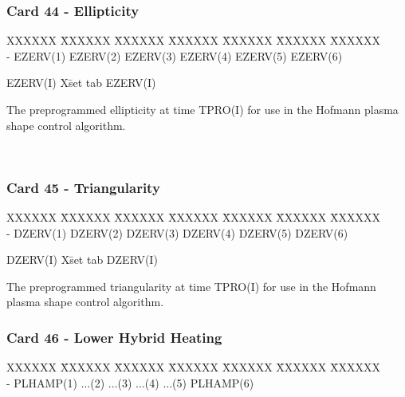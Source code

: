 \subsubsection{Card 44 - Ellipticity}
\begin{tabbing}
XXXXXX \= XXXXXX \= XXXXXX \= XXXXXX \= XXXXXX \= XXXXXX \=
XXXXXX       \\
\footnotesize - \>\footnotesize  EZERV(1) \>\footnotesize EZERV(2) \>\footnotesize EZERV(3)
\>\footnotesize EZERV(4) \>\footnotesize EZERV(5) \>\footnotesize EZERV(6) \\
\end{tabbing}
\begin{tabbing}
EZERV(I) X\= set tab \kill
EZERV(I) \> \parbox[t]{\width}{The preprogrammed ellipticity at time TPRO(I)
for use in the Hofmann plasma shape control algorithm.}\\
\end{tabbing}
\newpage \subsubsection{Card 45 - Triangularity}
\begin{tabbing}
XXXXXX \= XXXXXX \= XXXXXX \= XXXXXX \= XXXXXX \= XXXXXX \=
XXXXXX       \\
\footnotesize - \>\footnotesize  DZERV(1) \>\footnotesize DZERV(2) \>\footnotesize DZERV(3)
\>\footnotesize DZERV(4) \>\footnotesize DZERV(5) \>\footnotesize DZERV(6) \\
\end{tabbing}
\begin{tabbing}
DZERV(I) X\= set tab \kill
DZERV(I) \> \parbox[t]{\width}{The preprogrammed triangularity at time TPRO(I)
for use in the Hofmann plasma shape control algorithm.}
\end{tabbing}
\newpage \subsubsection{Card 46 - Lower Hybrid Heating}
\begin{tabbing}
XXXXXX \= XXXXXX \= XXXXXX \= XXXXXX \= XXXXXX \= XXXXXX \=
XXXXXX       \\
\footnotesize - \>\footnotesize  PLHAMP(1) \>\footnotesize $\ldots$(2) \>\footnotesize $\ldots$(3)
\>\footnotesize $\ldots$(4) \>\footnotesize $\ldots$(5) \>\footnotesize PLHAMP(6) \\
\end{tabbing}
